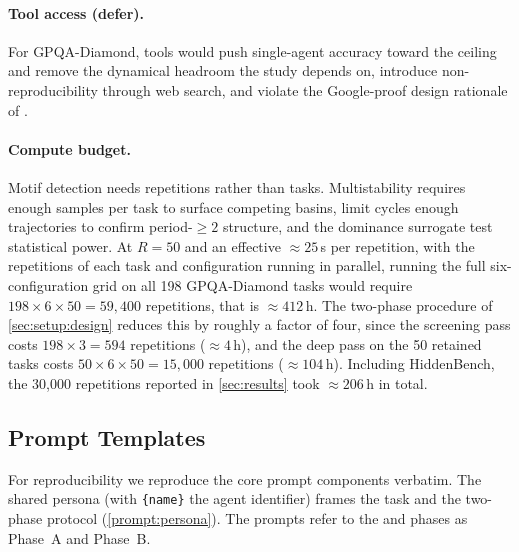 \paragraph{Tool access (defer).}
For GPQA-Diamond, tools would push single-agent accuracy toward the ceiling and
remove the dynamical headroom the study depends on, introduce non-reproducibility
through web search, and violate the Google-proof design rationale of
\citet{rein2024gpqa}.

\paragraph{Compute budget.}
Motif detection needs repetitions rather than tasks. Multistability requires enough
samples per task to surface competing basins, limit cycles enough trajectories to
confirm period-$\geq 2$ structure, and the dominance surrogate test statistical
power. At $R = 50$ and an effective $\approx 25$\,s per repetition, with the
repetitions of each task and configuration running in parallel, running the full
six-configuration grid on all 198 GPQA-Diamond tasks would require
$198 \times 6 \times 50 = 59{,}400$ repetitions, that is $\approx 412$\,h. The two-phase procedure of \autoref{sec:setup:design}
reduces this by roughly a factor of four, since the screening pass costs
$198 \times 3 = 594$ repetitions ($\approx 4$\,h), and the deep pass on the 50
retained tasks costs $50 \times 6 \times 50 = 15{,}000$ repetitions
($\approx 104$\,h). Including HiddenBench, the 30{,}000 repetitions reported in
\autoref{sec:results} took $\approx 206$\,h in total.

\subsection{Prompt Templates}
\label{app:prompts}

For reproducibility we reproduce the core prompt components verbatim. The shared
persona (with \texttt{\{name\}} the agent identifier) frames the task and the
two-phase protocol (\autoref{prompt:persona}). The prompts refer to the
\arguephase{} and \updatephase{} phases as Phase~A and Phase~B.

